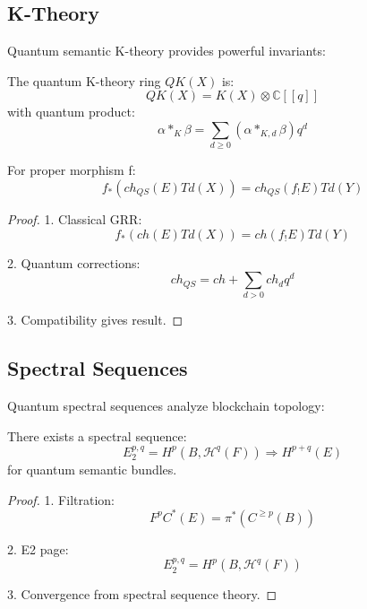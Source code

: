 \documentclass[12pt]{article}
\begin{document}
\subsection{K-Theory}

Quantum semantic K-theory provides powerful invariants:

\begin{definition}
The quantum K-theory ring $QK(X)$ is:
\begin{equation}
QK(X) = K(X) \otimes \mathbb{C}[[q]]
\end{equation}
with quantum product:
\begin{equation}
α *_K β = \sum_{d≥0} (α *_{K,d} β)q^d
\end{equation}
\end{definition}

\begin{theorem}
For proper morphism f:
\begin{equation}
f_*(ch_{QS}(E)Td(X)) = ch_{QS}(f_!E)Td(Y)
\end{equation}
\end{theorem}

\begin{proof}
1. Classical GRR:
\begin{equation}
f_*(ch(E)Td(X)) = ch(f_!E)Td(Y)
\end{equation}

2. Quantum corrections:
\begin{equation}
ch_{QS} = ch + \sum_{d>0} ch_d q^d
\end{equation}

3. Compatibility gives result.
\end{proof}

\subsection{Spectral Sequences}

Quantum spectral sequences analyze blockchain topology:

\begin{theorem}
There exists a spectral sequence:
\begin{equation}
E_2^{p,q} = H^p(B, \mathcal{H}^q(F)) \Rightarrow H^{p+q}(E)
\end{equation}
for quantum semantic bundles.
\end{theorem}

\begin{proof}
1. Filtration:
\begin{equation}
F^pC^*(E) = π^*(C^{\geq p}(B))
\end{equation}

2. E2 page:
\begin{equation}
E_2^{p,q} = H^p(B, \mathcal{H}^q(F))
\end{equation}

3. Convergence from spectral sequence theory.
\end{proof}
\end{document}
